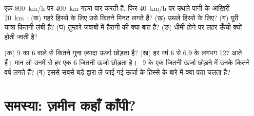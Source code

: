 \begin{exercise}[$\star\star\star$]\label{exo:g7:earthquakes:11}
एक  \qty{800}{km/h} पर \qty{400}{km} गहरा  पार करती है, फिर
\qty{40}{km/h} पर उथले पानी के आख़िरी \qty{20}{km}। (क) गहरे हिस्से के लिए उसे
कितने मिनट लगते हैं? (ख) उथले हिस्से के लिए? (ग) पूरी यात्रा कितनी लंबी है?
(घ) तुम्हारे जवाबों में हैरानी की क्या बात है? (ङ) धीमी होने पर लहर ऊँची क्यों
होती जाती है?
\end{exercise}

\begin{exercise}[$\star\star\star$]\label{exo:g7:earthquakes:12}
(क)  9 का   6 वाले से कितने गुना ज़्यादा ऊर्जा छोड़ता है? (ख) हर
वर्ष  6 से 6.9 के लगभग 127  आते हैं। मान लो उनमें से हर एक  6
जितनी ऊर्जा छोड़ता है। ~9 के एक  जितनी ऊर्जा छोड़ने में उनके कितने
वर्ष लगते हैं? (ग) इससे सबसे बड़े  द्वारा ले जाई गई ऊर्जा के हिस्से के बारे
में क्या पता चलता है?
\end{exercise}

\section{समस्या: ज़मीन कहाँ काँपी?}

